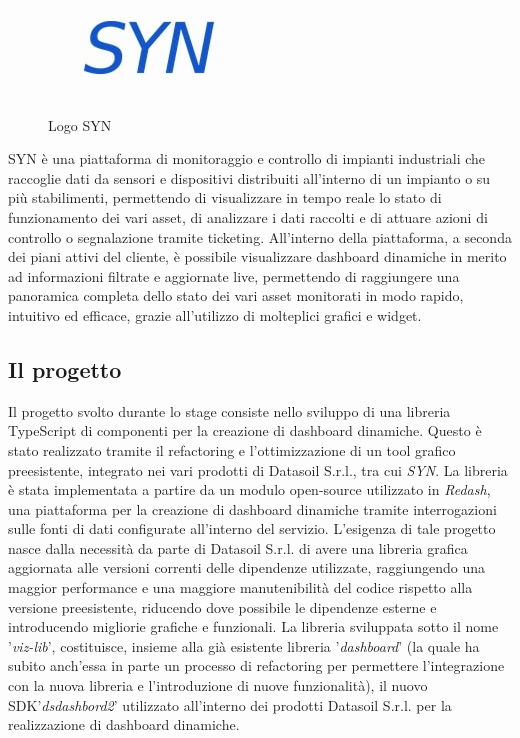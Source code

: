 \begin{figure}[H]
      \centering
      \includegraphics[alt={Logo SYN}, width=0.25\columnwidth]{img/syn_logo.jpg}
      \caption{Logo SYN}
      \label{fig:syn}
\end{figure}

SYN è una piattaforma di monitoraggio e controllo di impianti industriali che raccoglie dati da sensori e dispositivi
distribuiti all'interno di un impianto o su più stabilimenti, permettendo di visualizzare in tempo reale lo stato di
funzionamento dei vari asset, di analizzare i dati raccolti e di attuare azioni di controllo o segnalazione tramite
ticketing. All'interno della piattaforma, a seconda dei piani attivi del cliente, è possibile visualizzare dashboard dinamiche
in merito ad informazioni filtrate e aggiornate live, permettendo di raggiungere una panoramica completa dello stato dei vari
asset monitorati in modo rapido, intuitivo ed efficace, grazie all'utilizzo di molteplici grafici e widget.

\subsection{Il progetto}
Il progetto svolto durante lo stage consiste nello sviluppo di una libreria TypeScript di componenti per la creazione di dashboard dinamiche.
Questo è stato realizzato tramite il refactoring e l'ottimizzazione di un tool grafico preesistente, integrato nei vari prodotti di Datasoil S.r.l.,
tra cui \textit{SYN}. La libreria è stata implementata a partire da un modulo open-source utilizzato in \textit{Redash},
una piattaforma per la creazione di dashboard dinamiche tramite interrogazioni sulle fonti di dati configurate all'interno del servizio. \newline
L'esigenza di tale progetto nasce dalla necessità da parte di Datasoil S.r.l. di avere una libreria grafica aggiornata alle versioni
correnti delle dipendenze utilizzate, raggiungendo una maggior performance e una maggiore manutenibilità del codice rispetto alla versione
preesistente, riducendo dove possibile le dipendenze esterne e introducendo migliorie grafiche e funzionali. \newline
La libreria sviluppata sotto il nome '\textit{viz-lib}', costituisce, insieme alla già esistente libreria '\textit{dashboard}' (la quale ha subito anch'essa in parte un processo di refactoring
per permettere l'integrazione con la nuova libreria e l'introduzione di nuove funzionalità), il nuovo \gls{SDK}\glox '\textit{dsdashbord2}'
utilizzato all'interno dei prodotti Datasoil S.r.l. per la realizzazione di dashboard dinamiche.

